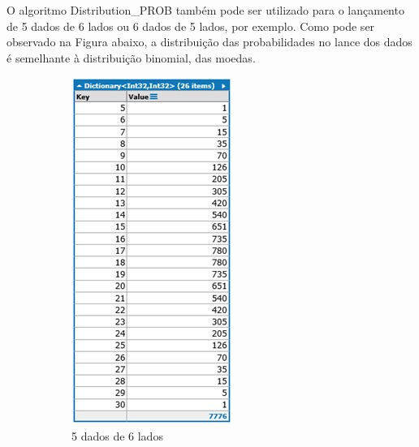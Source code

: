 \begin{apendicesenv}
O algoritmo Distribution\_PROB também pode ser utilizado para o lançamento de 5 dados de 6 lados ou 6 dados de 5 lados, por exemplo. Como pode ser observado na Figura abaixo, a distribuição das probabilidades no lance dos dados é semelhante à distribuição binomial, das moedas.
	\begin{figure}[H]
	\centering
		\begin{subfigure}[H]{0.47\linewidth}
		\centering
		\includegraphics[width=.6\linewidth]{sections/images/Distribution_PROB_5_6.jpg}
		\caption{5 dados de 6 lados}
		\label{fig:Distribution_PROB_5_6}
		\end{subfigure}
	\hfill
		\begin{subfigure}[H]{0.47\linewidth}
		\centering

\end{subfigure}
\end{figure}
\end{apendicesenv}
